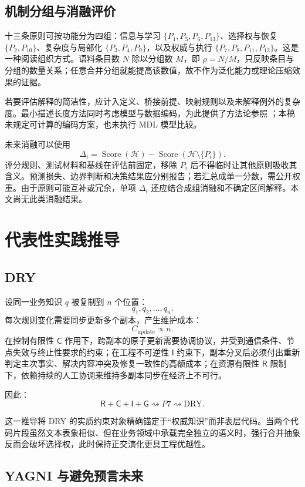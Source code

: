 \documentclass[11pt,a4paper]{ctexart}
\numberwithin{equation}{section}
\theoremstyle{definition}
\theoremstyle{plain}
\newcommand{\Res}{\mathsf{R}}
\newcommand{\Ctrl}{\mathsf{C}}
\newcommand{\Info}{\mathsf{I}}
\newcommand{\Goal}{\mathsf{G}}
\begin{document}
\subsection{机制分组与消融评价}

十三条原则可按功能分为四组：信息与学习 $\{P_1,P_5,P_6,P_{13}\}$、选择权与恢复 $\{P_2,P_{10}\}$、复杂度与局部化 $\{P_3,P_4,P_9\}$，以及权威与执行 $\{P_7,P_8,P_{11},P_{12}\}$。这是一种阅读组织方式。语料条目数 $N$ 除以分组数 $M$，即 $\rho=N/M$，只反映条目与分组的数量关系；任意合并分组就能提高该数值，故不作为泛化能力或理论压缩效果的证据。

若要评估解释的简洁性，应计入定义、桥接前提、映射规则以及未解释例外的复杂度。最小描述长度方法同时考虑模型与数据编码，为此提供了方法论参照 \cite{grunwald2004}；本稿未规定可计算的编码方案，也未执行 MDL 模型比较。

未来消融可以使用
\[
\Delta_i=\operatorname{Score}(\mathcal H)
-\operatorname{Score}(\mathcal H\setminus\{P_i\}).
\]
评分规则、测试材料和基线在评估前固定，移除 $P_i$ 后不得临时让其他原则吸收其含义。预测损失、边界判断和决策结果应分别报告；若汇总成单一分数，需公开权重。由于原则可能互补或冗余，单项 $\Delta_i$ 还应结合成组消融和不确定区间解释。本文尚无此类消融结果。

\section{代表性实践推导}

\subsection{DRY}

设同一业务知识 $q$ 被复制到 $n$ 个位置：
\[
q_1,q_2,\ldots,q_n.
\]
每次规则变化需要同步更新多个副本，产生维护成本：
\[
C_{\mathrm{update}}\propto n.
\]
在控制有限性 $\Ctrl$ 作用下，跨副本的原子更新需要协调协议，并受到通信条件、节点失效与终止性要求的约束；在工程不可逆性 $\Info$ 约束下，副本分叉后必须付出重新判定主次事实、解决内容冲突及修复一致性的高额成本；在资源有限性 $\Res$ 限制下，依赖持续的人工协调来维持多副本同步在经济上不可行。

因此：
\[
\Res+\Ctrl+\Info+\Goal
\rightsquigarrow
P7
\rightsquigarrow
\text{DRY}.
\]

这一推导将 DRY 的实质约束对象精确锚定于“权威知识”而非表层代码。当两个代码片段虽然文本表象相似、但在业务领域中承载完全独立的语义时，强行合并抽象反而会破坏选择权，此时保持正交演化更具工程优越性。

\subsection{YAGNI 与避免预言未来}
\end{document}
